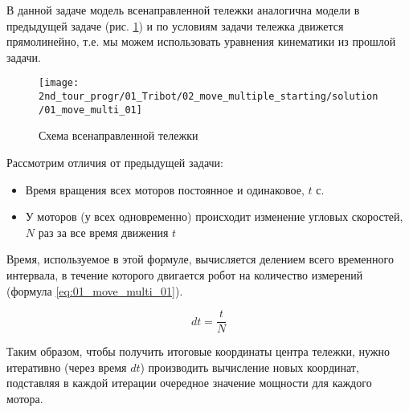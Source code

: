 \solutionSection

В данной задаче модель всенаправленной тележки аналогична модели в предыдущей задаче (рис. \ref{fig:01_move_multi_01}) и по условиям задачи тележка движется прямолинейно, т.е. мы можем использовать уравнения кинематики из прошлой задачи. 

\begin{figure}[h!]
	\centering
	\texttt{[image: 2nd\_tour\_progr/01\_Tribot/02\_move\_multiple\_starting/solution/01\_move\_multi\_01]}
	\caption{Схема всенаправленной тележки}
	\label{fig:01_move_multi_01}
\end{figure}

Рассмотрим отличия от предыдущей задачи:
\begin{itemize}
	\item Время вращения всех моторов постоянное и одинаковое, $t$ с.
	\item У моторов (у всех одновременно) происходит изменение угловых скоростей, $N$ раз за все время движения $t$
\end{itemize}

Время, используемое в этой формуле, вычисляется делением всего временного интервала, в течение которого двигается робот на количество измерений (формула \ref{eq:01_move_multi_01}).

\begin{equation}
	dt = \frac{t}{N}
	\label{eq:01_move_multi_01}
\end{equation}

Таким образом, чтобы получить итоговые координаты центра тележки, нужно итеративно (через время $dt$) производить вычисление новых координат, подставляя в каждой итерации очередное значение мощности для каждого мотора.

\codeExample

{}
